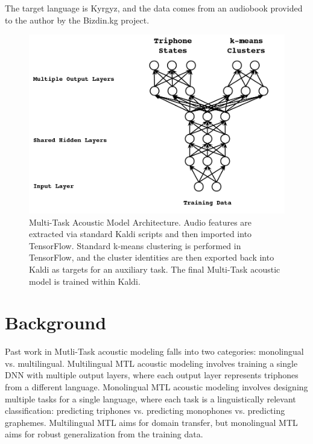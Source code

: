 \documentclass[a4paper]{article}
\begin{document}
The target language is Kyrgyz, and the data comes from an audiobook provided to the author by the Bizdin.kg project.

\begin{figure}[!htbp]
  \centering
{}
  \includegraphics[width=\linewidth]{figs/heigold-2013-dnn-c.png}
  \caption{Multi-Task Acoustic Model Architecture. Audio features are extracted via standard Kaldi scripts and then imported into TensorFlow. Standard k-means clustering is performed in TensorFlow, and the cluster identities are then exported back into Kaldi as targets for an auxiliary task. The final Multi-Task acoustic model is trained within Kaldi.}
    \label{fig:mtl-dnn}
  \endminipage\hfill
\end{figure}


\section{Background}

Past work in Mutli-Task acoustic modeling falls into two categories: monolingual vs. multilingual. Multilingual MTL acoustic modeling involves training a single DNN with multiple output layers, where each output layer represents triphones from a different language. Monolingual MTL acoustic modeling involves designing multiple tasks for a single language, where each task is a linguistically relevant classification: predicting triphones vs. predicting monophones vs. predicting graphemes. Multilingual MTL aims for domain transfer, but monolingual MTL aims for robust generalization from the training data.

\end{document}

